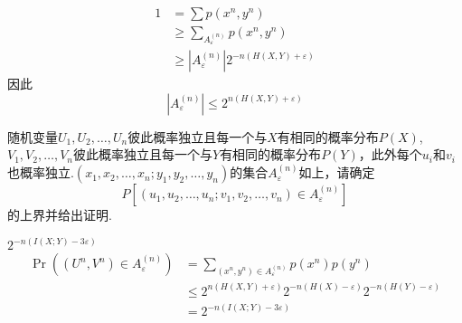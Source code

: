 \documentclass[a4paper]{exam}
\begin{document}
\begin{CJK*}{UTF8}{gbsn}
\begin{questions}
\begin{solution}
\begin{equation*}
            \begin{split}
            1 &= \sum {p({x^n},{y^n})}  \\
            &\ge \sum\nolimits_{A_\varepsilon ^{(n)}} {p({x^n},{y^n})}\\
            & \ge \left| {A_\varepsilon ^{(n)}} \right|{2^{ - n(H(X,Y) + \varepsilon )}}
            \end{split}
        \end{equation*}
        因此 \[\left| {A_\varepsilon ^{(n)}} \right| \le {2^{n(H(X,Y) + \varepsilon )}}\]
    \end{solution}
\vspace{1.7cm}
\question
随机变量${U_1},{U_2}, \ldots ,{U_n}$彼此概率独立且每一个与$X$有相同的概率分布$P(X)$, ${V_1},{V_2}, \ldots ,{V_n}$彼此概率独立且每一个与$Y$有相同的概率分布$P(Y)$，此外每个${u_i}$和${v_i}$也概率独立.${({x_1},{x_2}, \ldots ,{x_n};{y_1},{y_2}, \ldots ,{y_n})}$的集合$A_\varepsilon ^{(n)}$如上，请确定\[P\left[ {({u_1},{u_2}, \ldots ,{u_n};{v_1},{v_2}, \ldots ,{v_n}) \in A_\varepsilon ^{(n)}} \right]\]的上界并给出证明.
\begin{solution}
${2^{ - n(I(X;Y) - 3\varepsilon )}}$
    \begin{equation*}
        \begin{split}
        \Pr (({U^n},{V^n}) \in A_\varepsilon ^{(n)}) & = \sum\limits_{({x^n},{y^n}) \in A_\varepsilon ^{(n)}} {p({x^n})p({y^n})}\\
        & \le {2^{n(H(X,Y) + \varepsilon )}}{2^{ - n(H(X) - \varepsilon )}}{2^{ - n(H(Y) - \varepsilon )}}\\
        & = {2^{ - n(I(X;Y) - 3\varepsilon )}}
        \end{split}
    \end{equation*}
\end{solution}
\vspace{1.8cm}
\end{questions}


\end{CJK*}
\end{document}
